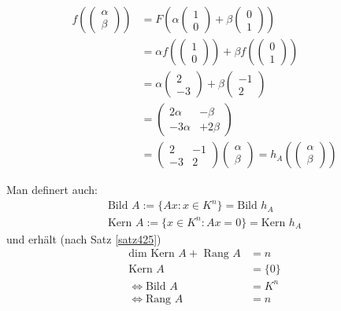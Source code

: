 \documentclass[11pt]{report}
\begin{document}
\begin{align}
 f(\begin{pmatrix} \alpha \\ \beta \end{pmatrix}) &= F (\alpha \begin{pmatrix} 1 \\ 0 \end{pmatrix} + \beta \begin{pmatrix} 0 \\ 1\end{pmatrix}) \\
 &= \alpha f(\begin{pmatrix} 1 \\ 0\end{pmatrix}) + \beta f(\begin{pmatrix} 0 \\ 1 \end{pmatrix}) \\
 &= \alpha\begin{pmatrix} 2 \\ -3\end{pmatrix} + \beta \begin{pmatrix} -1 \\ 2\end{pmatrix}\\
 &= \begin{pmatrix}2 \alpha & -\beta \\ -3 \alpha & +2 \beta \end{pmatrix} \\
 &= \begin{pmatrix} 2 & -1 \\ -3 & 2\end{pmatrix} \begin{pmatrix} \alpha \\ \beta \end{pmatrix} =
 h_A (\begin{pmatrix} \alpha \\ \beta \end{pmatrix})
\end{align}

Man definert auch:
\begin{align}
\text{Bild } A := \{Ax: x \in K^n\} = \text{Bild } h_A\\
\text{Kern } A := \{x  \in K^n: Ax=0\} = \text{Kern } h_A
\end{align}
und erhält (nach Satz \ref{satz425})
\begin{align}
 \text{dim Kern } A + \text{ Rang } A &= n\\
\text{Kern } A &= \{0\}\\
\Leftrightarrow \text{Bild } A &= K^n\\
\Leftrightarrow \text{Rang } A &= n
\end{align}
\end{document}
